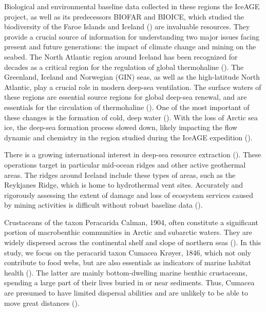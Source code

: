 Biological and environmental baseline data collected in these regions the IceAGE project, as well as its predecessors BIOFAR and BIOICE, which studied the biodiversity of the Faroe Islands and Iceland (\cite{meisner_prefacebiodiversity_2018}) are invaluable resources. They provide a crucial source of information for understanding two major issues facing present and future generations: the impact of climate change and mining on the seabed. The North Atlantic region around Iceland has been recognized for decades as a critical region for the regulation of global thermohaline (\cite{meisner_prefacebiodiversity_2018}). The Greenland, Iceland and Norwegian (GIN) seas, as well as the high-latitude North Atlantic, play a crucial role in modern deep-sea ventilation. The surface waters of these regions are essential source regions for global deep-sea renewal, and are essentials for the circulation of thermohaline (\cite{johannessen_relationship_1994}). One of the most important of these changes is the formation of cold, deep water (\cite{meisner_prefacebiodiversity_2018}). With the loss of Arctic sea ice, the deep-sea formation process slowed down, likely impacting the flow dynamic and chemistry in the region studied during the IceAGE expedition (\cite{meisner_prefacebiodiversity_2018}).

There is a growing international interest in deep-sea resource extraction (\cite{mengerink_call_2014}). These operations target in particular mid-ocean ridges and other active geothermal areas. The ridges around Iceland include these types of areas, such as the Reykjanes Ridge, which is home to hydrothermal vent sites. Accurately and rigorously assessing the extent of damage and loss of ecosystem services caused by mining activities is difficult without robust baseline data (\cite{meisner_prefacebiodiversity_2018}).

Crustaceans of the taxon Peracarida Calman, 1904, often constitute a significant portion of macrobenthic communities in Arctic and subarctic waters. They are widely dispersed across the continental shelf and slope of northern seas (\cite{stransky_diversity_2010}). In this study, we focus on the peracarid taxon Cumacea Krøyer, 1846, which not only contribute to food webs, but are also essentials as indicators of marine habitat health (\cite{stransky_diversity_2010}). The latter are mainly bottom-dwelling marine benthic crustaceans, spending a large part of their lives buried in or near sediments. Thus, Cumacea are presumed to have limited dispersal abilities and are unlikely to be able to move great distances (\cite{uhlir_adding_2021}).

